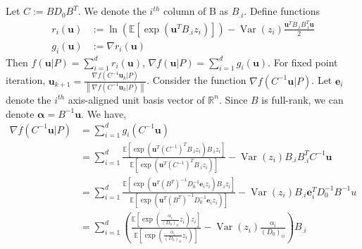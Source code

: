 \documentclass[letterpaper]{article}
\newcommand{\bas}[1]{\begin{align*}#1\end{align*}}
\newcommand{\bu}{\pmb{u}}
\newcommand{\balpha}{\pmb{\alpha}}
\newcommand{\be}{\pmb{e}}
\newcommand{\bb}[1]{\left(#1\right)}
\newcommand{\bbb}[1]{\left[#1\right]}
\DeclareMathOperator{\Var}{Var}
\begin{document}
\\ \\ 
Let $C := BD_{0}B^{T}$. We denote the $i^{th}$ column of B as $B_{.i}$. Define functions 
\bas{
    r_{i}\bb{\bu} &:= \ln\bb{\mathbb{E}\bbb{\exp\bb{\bu^{T}B_{.i}z_{i}}}} -\Var\bb{z_{i}}\frac{\bu^{T}B_{.i}B_{.i}^{T}\bu}{2} \\ 
    g_{i}\bb{\bu} &:= \nabla r_{i}\bb{\bu} %
}
Then $f\bb{\bu|P} = \sum_{i=1}^{d}r_{i}\bb{\bu}$, $\nabla f\bb{\bu|P} = \sum_{i=1}^{d} g_{i}\bb{\bu}$. %
\noindent
For fixed point iteration, $\bu_{k+1} = \frac{\nabla f\bb{C^{-1}\bu_{k}|P}}{\left\|\nabla f\bb{C^{-1}\bu_{k}|P}\right\|}$. Consider the function $\nabla f\bb{C^{-1}\bu|P}$. Let $\bm{e}_{i}$ denote the $i^{th}$ axis-aligned unit basis vector of $\mathbb{R}^{n}$. Since $B$ is full-rank, we can denote $\balpha = B^{-1}\bu$. We have, 
\bas{
    \nabla f\bb{C^{-1}\bu|P} &= \sum_{i=1}^{d} g_{i}\bb{C^{-1}\bu} \\ 
                        &= \sum_{i=1}^{d} \frac{\mathbb{E}\bbb{\exp\bb{\bu^{T}\bb{C^{-1}}^{T}B_{.i}z_{i}}B_{.i}z_{i}}}{\mathbb{E}\bbb{\exp\bb{\bu^{T}\bb{C^{-1}}^{T}B_{.i}z_{i}}}} -\Var\bb{z_{i}}B_{.i}B_{.i}^{T}C^{-1}\bu \\ 
                        &= \sum_{i=1}^{d} \frac{\mathbb{E}\bbb{\exp\bb{\bu^{T}\bb{B^{T}}^{-1}D_{0}^{-1}\be_{i}z_{i}}B_{.i}z_{i}}}{\mathbb{E}\bbb{\exp\bb{\bu^{T}\bb{B^{T}}^{-1}D_{0}^{-1}\be_{i}z_{i}}}} -\Var\bb{z_{i}}B_{.i}\be_{i}^{T}D_{0}^{-1}B^{-1}u \\ 
                        &= \sum_{i=1}^{d} \bb{\frac{\mathbb{E}\bbb{\exp\bb{\frac{\alpha_{i}}{\bb{D_{0}}_{ii}}z_{i}}z_{i}}}{\mathbb{E}\bbb{\exp\bb{\frac{\alpha_{i}}{\bb{D_{0}}_{ii}}z_{i}}}} -\Var\bb{z_{i}}\frac{\alpha_{i}}{\bb{D_{0}}_{ii}}}B_{.i}
}
\end{document}
